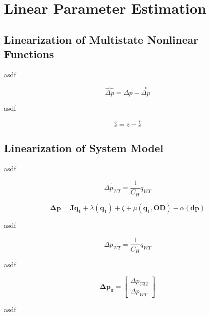 \section{Linear Parameter Estimation} 
\label{LinParamEst}

\subsection{Linearization of Multistate Nonlinear Functions}
\label{LinearizationIntro}

asdf

\begin{equation}
 \hat{\Delta p} = \Delta p -  \overset{*}{\Delta p}
\label{p_operating}
\end{equation}

asdf

\begin{equation}
 \hat{z} = z -  \overset{*}{z}
\label{p_operating}
\end{equation}

\subsection{Linearization of System Model}
\label{LinearizationIntro}

asdf

\begin{equation}
 \dot{\Delta p_{WT}} = \frac{1}{C_H} q_{WT}
\label{WTeq1}
\end{equation}

\begin{equation}
 \pmb{ \Delta p} = \pmb{J \dot{q_1}} + \lambda(\pmb{q_1}) + \zeta + \mu(\pmb{q_1}, \pmb{OD}) - \alpha(\pmb{dp})
\label{NonlinearPressureFunction}
\end{equation}

asdf

\begin{equation}
 \dot{\Delta p_{WT}} = \frac{1}{C_H} q_{WT}
\label{WTeq2}
\end{equation}

asdf

\begin{equation}
\pmb{\Delta p_0} =
\begin{bmatrix}
         \Delta p_{C32} \\
	\Delta p_{WT}
\end{bmatrix}
\label{pvector}
\end{equation}

asdf

